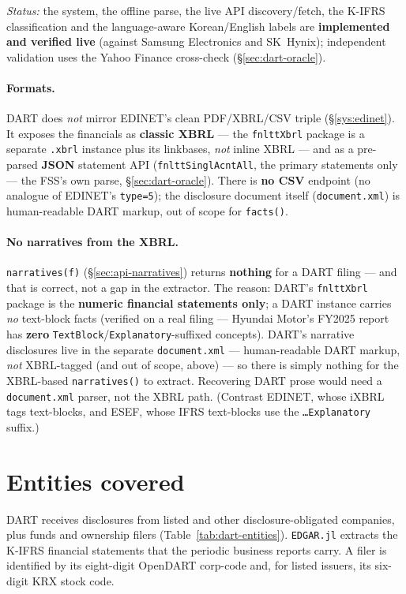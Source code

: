 \documentclass[11pt,a4paper]{report}
\begin{document}
\emph{Status:} the system, the offline parse, the live API discovery/fetch, the K-IFRS classification and
the language-aware Korean/English labels are \textbf{implemented and verified live} (against Samsung
Electronics and SK~Hynix); independent validation uses the Yahoo Finance cross-check
(\S\ref{sec:dart-oracle}).

\paragraph{Formats.} DART does \emph{not} mirror EDINET's clean PDF/XBRL/CSV triple (\S\ref{sys:edinet}).
It exposes the financials as \textbf{classic XBRL} --- the \texttt{fnlttXbrl} package is a separate
\texttt{.xbrl} instance plus its linkbases, \emph{not} inline XBRL --- and as a pre-parsed \textbf{JSON}
statement API (\texttt{fnlttSinglAcntAll}, the primary statements only --- the FSS's own parse,
\S\ref{sec:dart-oracle}). There is \textbf{no CSV} endpoint (no analogue of EDINET's \texttt{type=5}); the
disclosure document itself (\texttt{document.xml}) is human-readable DART markup, out of scope for
\texttt{facts()}.

\paragraph{No narratives from the XBRL.} \texttt{narratives(f)} (\S\ref{sec:api-narratives}) returns
\textbf{nothing} for a DART filing --- and that is correct, not a gap in the extractor. The reason: DART's
\texttt{fnlttXbrl} package is the \textbf{numeric financial statements only}; a DART instance carries
\emph{no} text-block facts (verified on a real filing --- Hyundai Motor's FY2025 report has \textbf{zero}
\texttt{TextBlock}/\texttt{Explanatory}-suffixed concepts). DART's narrative disclosures live in the separate
\texttt{document.xml} --- human-readable DART markup, \emph{not} XBRL-tagged (and out of scope, above) --- so
there is simply nothing for the XBRL-based \texttt{narratives()} to extract. Recovering DART prose would need
a \texttt{document.xml} parser, not the XBRL path. (Contrast EDINET, whose iXBRL tags text-blocks, and ESEF,
whose IFRS text-blocks use the \texttt{…Explanatory} suffix.)

\section{Entities covered}\label{sec:dart-entities}

DART receives disclosures from listed and other disclosure-obligated companies, plus funds and ownership
filers (Table~\ref{tab:dart-entities}). \texttt{EDGAR.jl} extracts the K-IFRS financial statements that the
periodic business reports carry. A filer is identified by its eight-digit OpenDART corp-code and, for listed
issuers, its six-digit KRX stock code.
\end{document}
